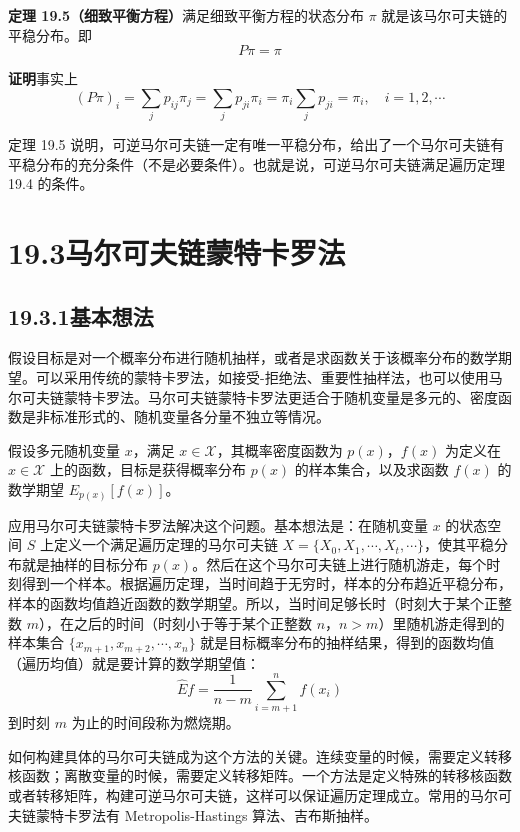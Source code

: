 \documentclass[UTF8, 12pt, fontset=fandol, oneside]{ctexart}
\begin{document}
\noindent\textbf{定理 19.5（细致平衡方程）}\quad 满足细致平衡方程的状态分布 $\pi$ 就是该马尔可夫链的平稳分布。即
\[
P\pi=\pi
\]

\noindent\textbf{证明}\quad 事实上
\begin{equation}
(P\pi)_i=\sum_j p_{ij}\pi_j=\sum_j p_{ji}\pi_i=\pi_i\sum_j p_{ji}=\pi_i,\quad i=1,2,\cdots
\tag{19.31}
\end{equation}

定理 19.5 说明，可逆马尔可夫链一定有唯一平稳分布，给出了一个马尔可夫链有平稳分布的充分条件（不是必要条件）。也就是说，可逆马尔可夫链满足遍历定理 19.4 的条件。

\section*{19.3\quad 马尔可夫链蒙特卡罗法}

\subsection*{19.3.1\quad 基本想法}

假设目标是对一个概率分布进行随机抽样，或者是求函数关于该概率分布的数学期望。可以采用传统的蒙特卡罗法，如接受-拒绝法、重要性抽样法，也可以使用马尔可夫链蒙特卡罗法。马尔可夫链蒙特卡罗法更适合于随机变量是多元的、密度函数是非标准形式的、随机变量各分量不独立等情况。

假设多元随机变量 $x$，满足 $x\in\mathcal{X}$，其概率密度函数为 $p(x)$，$f(x)$ 为定义在 $x\in\mathcal{X}$ 上的函数，目标是获得概率分布 $p(x)$ 的样本集合，以及求函数 $f(x)$ 的数学期望 $E_{p(x)}[f(x)]$。

应用马尔可夫链蒙特卡罗法解决这个问题。基本想法是：在随机变量 $x$ 的状态空间 $S$ 上定义一个满足遍历定理的马尔可夫链 $X=\{X_0,X_1,\cdots,X_t,\cdots\}$，使其平稳分布就是抽样的目标分布 $p(x)$。然后在这个马尔可夫链上进行随机游走，每个时刻得到一个样本。根据遍历定理，当时间趋于无穷时，样本的分布趋近平稳分布，样本的函数均值趋近函数的数学期望。所以，当时间足够长时（时刻大于某个正整数 $m$），在之后的时间（时刻小于等于某个正整数 $n$，$n>m$）里随机游走得到的样本集合 $\{x_{m+1},x_{m+2},\cdots,x_n\}$ 就是目标概率分布的抽样结果，得到的函数均值（遍历均值）就是要计算的数学期望值：
\begin{equation}
\hat E f=\frac{1}{n-m}\sum_{i=m+1}^{n}f(x_i)
\tag{19.32}
\end{equation}
到时刻 $m$ 为止的时间段称为燃烧期。

如何构建具体的马尔可夫链成为这个方法的关键。连续变量的时候，需要定义转移核函数；离散变量的时候，需要定义转移矩阵。一个方法是定义特殊的转移核函数或者转移矩阵，构建可逆马尔可夫链，这样可以保证遍历定理成立。常用的马尔可夫链蒙特卡罗法有 Metropolis-Hastings 算法、吉布斯抽样。
\end{document}
